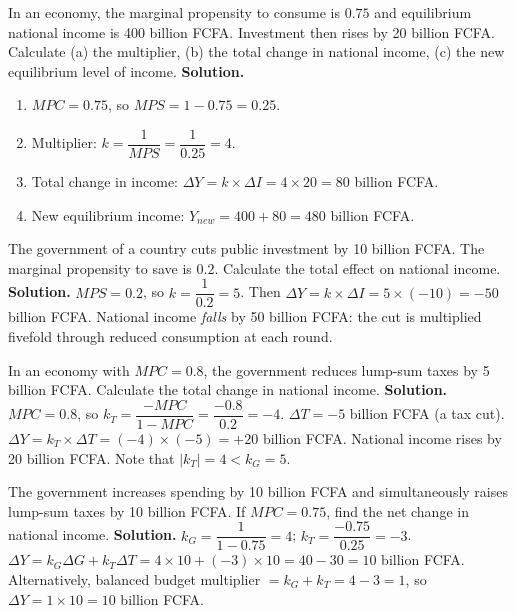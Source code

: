 \documentclass[11pt]{article}
\begin{document}
\begin{exoresolu}
In an economy, the marginal propensity to consume is $0.75$ and equilibrium national income is 400 billion FCFA. Investment then rises by 20 billion FCFA. Calculate (a) the multiplier, (b) the total change in national income, (c) the new equilibrium level of income.
\tcblower
\textbf{Solution.}
\begin{enumerate}
\item $MPC = 0.75$, so $MPS = 1 - 0.75 = 0.25$.
\item Multiplier: $k = \dfrac{1}{MPS} = \dfrac{1}{0.25} = 4$.
\item Total change in income: $\Delta Y = k \times \Delta I = 4 \times 20 = 80$ billion FCFA.
\item New equilibrium income: $Y_{new} = 400 + 80 = 480$ billion FCFA.
\end{enumerate}
\end{exoresolu}

\begin{exoresolu}
The government of a country cuts public investment by 10 billion FCFA. The marginal propensity to save is $0.2$. Calculate the total effect on national income.
\tcblower
\textbf{Solution.} $MPS = 0.2$, so $k = \dfrac{1}{0.2} = 5$. Then $\Delta Y = k \times \Delta I = 5 \times (-10) = -50$ billion FCFA. National income \emph{falls} by 50 billion FCFA: the cut is multiplied fivefold through reduced consumption at each round.
\end{exoresolu}

\begin{exoresolu}
In an economy with $MPC = 0.8$, the government reduces lump-sum taxes by 5 billion FCFA. Calculate the total change in national income.
\tcblower
\textbf{Solution.}
$MPC = 0.8$, so $k_T = \dfrac{-MPC}{1-MPC} = \dfrac{-0.8}{0.2} = -4$.
$\Delta T = -5$ billion FCFA (a tax cut).
$\Delta Y = k_T \times \Delta T = (-4) \times (-5) = +20$ billion FCFA.
National income rises by 20 billion FCFA. Note that $|k_T| = 4 < k_G = 5$.
\end{exoresolu}

\begin{exoresolu}
The government increases spending by 10 billion FCFA and simultaneously raises lump-sum taxes by 10 billion FCFA. If $MPC = 0.75$, find the net change in national income.
\tcblower
\textbf{Solution.}
$k_G = \dfrac{1}{1-0.75} = 4$; $k_T = \dfrac{-0.75}{0.25} = -3$.
$\Delta Y = k_G \Delta G + k_T \Delta T = 4 \times 10 + (-3) \times 10 = 40 - 30 = 10$ billion FCFA.
Alternatively, balanced budget multiplier $= k_G + k_T = 4 - 3 = 1$, so $\Delta Y = 1 \times 10 = 10$ billion FCFA.
\end{exoresolu}
\end{document}
